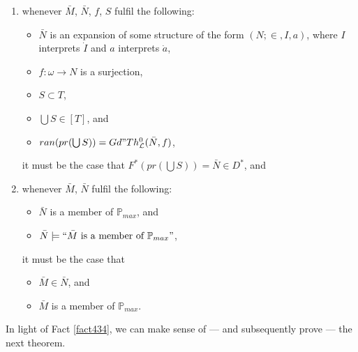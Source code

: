 \documentclass[12pt]{article}
\numberwithin{equation}{section}
\begin{document}
\begin{fact}
\begin{enumerate}[label=(4.34.\arabic*), leftmargin=50pt]
    \item\label{4346b} whenever $\bar{M}$, $\bar{N}$, $f$, $S$ fulfil the following:
    \begin{itemize}
        \item $\bar{N}$ is an expansion of some structure of the form $(N; \in, I, a)$, where $I$ interprets $\dot{I}$ and $a$ interprets $\dot{a}$,
        \item $f : \omega \longrightarrow N$ is a surjection,
        \item $S \subset T$,
        \item $\bigcup S \in [T]$, and
        \item $ran(pr(\bigcup S)) = Gd" Th^0_{\mathcal{L}}(\bar{N}, f)$,
    \end{itemize}
    it must be the case that $F^*(pr(\bigcup S)) = \bar{N} \in D^*$, and
    \item\label{4346} whenever $\bar{M}$, $\bar{N}$ fulfil the following:
    \begin{itemize}
        \item $\bar{N}$ is a member of $\mathbb{P}_{max}$, and
        \item $\bar{N} \models ``\bar{M} \text{ is a member of } \mathbb{P}_{max}"$,
    \end{itemize}
    it must be the case that
    \begin{itemize}
        \item $\bar{M} \in \bar{N}$, and
        \item $\bar{M}$ is a member of $\mathbb{P}_{max}$.
    \end{itemize}
\end{enumerate}
\end{fact}

In light of Fact \ref{fact434}, we can make sense of --- and subsequently prove --- the next theorem.
\end{document}
